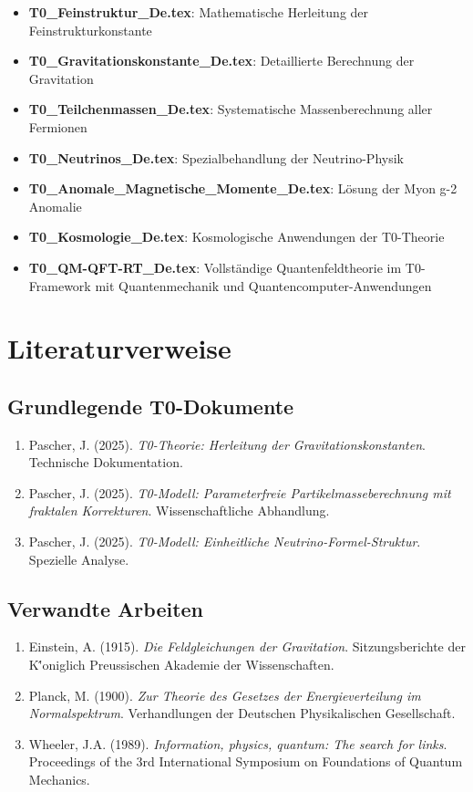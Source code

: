 \documentclass[12pt,a4paper]{article}
\begin{document}
\begin{itemize}
	\item \textbf{T0\_Feinstruktur\_De.tex}: Mathematische Herleitung der Feinstrukturkonstante
	\item \textbf{T0\_Gravitationskonstante\_De.tex}: Detaillierte Berechnung der Gravitation
	\item \textbf{T0\_Teilchenmassen\_De.tex}: Systematische Massenberechnung aller Fermionen
	\item \textbf{T0\_Neutrinos\_De.tex}: Spezialbehandlung der Neutrino-Physik
	\item \textbf{T0\_Anomale\_Magnetische\_Momente\_De.tex}: Lösung der Myon g-2 Anomalie
	\item \textbf{T0\_Kosmologie\_De.tex}: Kosmologische Anwendungen der T0-Theorie
	\item \textbf{T0\_QM-QFT-RT\_De.tex}: Vollständige Quantenfeldtheorie im T0-Framework mit Quantenmechanik und Quantencomputer-Anwendungen
\end{itemize}


	\section{Literaturverweise}
	
	\subsection{Grundlegende T0-Dokumente}
	
	\begin{enumerate}
		\item Pascher, J. (2025). \textit{T0-Theorie: Herleitung der Gravitationskonstanten}. Technische Dokumentation.
		\item Pascher, J. (2025). \textit{T0-Modell: Parameterfreie Partikelmasseberechnung mit fraktalen Korrekturen}. Wissenschaftliche Abhandlung.
		\item Pascher, J. (2025). \textit{T0-Modell: Einheitliche Neutrino-Formel-Struktur}. Spezielle Analyse.
	\end{enumerate}
	
	\subsection{Verwandte Arbeiten}
	
	\begin{enumerate}
		\item Einstein, A. (1915). \textit{Die Feldgleichungen der Gravitation}. Sitzungsberichte der K\''oniglich Preussischen Akademie der Wissenschaften.
		\item Planck, M. (1900). \textit{Zur Theorie des Gesetzes der Energieverteilung im Normalspektrum}. Verhandlungen der Deutschen Physikalischen Gesellschaft.
		\item Wheeler, J.A. (1989). \textit{Information, physics, quantum: The search for links}. Proceedings of the 3rd International Symposium on Foundations of Quantum Mechanics.
	\end{enumerate}
	
\end{document}
